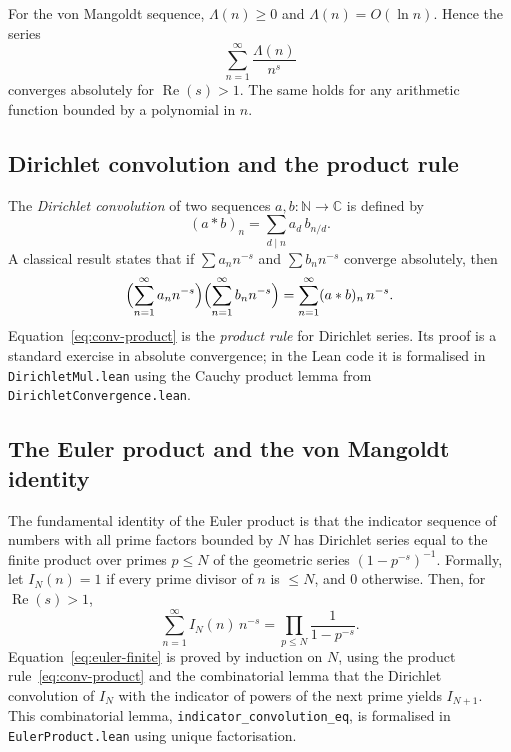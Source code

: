 \documentclass[11pt,reqno]{amsart}
\theoremstyle{definition}
\theoremstyle{remark}
\begin{document}
For the von Mangoldt sequence, \(\Lambda(n)\ge 0\) and \(\Lambda(n)=O(\ln n)\).  Hence the series
\[
\sum_{n=1}^{\infty}\frac{\Lambda(n)}{n^{s}}
\]
converges absolutely for \(\operatorname{Re}(s)>1\).  The same holds for any arithmetic function bounded by a polynomial in \(n\).

\subsection{Dirichlet convolution and the product rule}
\label{sec:convolution}

The \emph{Dirichlet convolution} of two sequences \(a,b:\mathbb N\to\mathbb C\) is defined by
\[
(a*b)_n = \sum_{d\mid n} a_d\, b_{n/d}.
\]
A classical result states that if \(\sum a_n n^{-s}\) and \(\sum b_n n^{-s}\) converge absolutely, then
\begin{equation}\label{eq:conv-product}
\Bigl(\sum_{n=1}^{\infty} a_n n^{-s}\Bigr)\Bigl(\sum_{n=1}^{\infty} b_n n^{-s}\Bigr) = \sum_{n=1}^{\infty} (a*b)_n\, n^{-s}.
\end{equation}
Equation~\eqref{eq:conv-product} is the \emph{product rule} for Dirichlet series.  Its proof is a standard exercise in absolute convergence; in the Lean code it is formalised in \texttt{DirichletMul.lean} using the Cauchy product lemma from \texttt{DirichletConvergence.lean}.

\subsection{The Euler product and the von Mangoldt identity}
\label{sec:euler-product-proof}

The fundamental identity of the Euler product is that the indicator sequence of numbers with all prime factors bounded by \(N\) has Dirichlet series equal to the finite product over primes \(p\le N\) of the geometric series \((1-p^{-s})^{-1}\).  Formally, let \(I_N(n)=1\) if every prime divisor of \(n\) is \(\le N\), and \(0\) otherwise.  Then, for \(\operatorname{Re}(s)>1\),
\begin{equation}\label{eq:euler-finite}
\sum_{n=1}^{\infty} I_N(n)\, n^{-s} = \prod_{p\le N}\frac{1}{1-p^{-s}}.
\end{equation}
Equation~\eqref{eq:euler-finite} is proved by induction on \(N\), using the product rule~\eqref{eq:conv-product} and the combinatorial lemma that the Dirichlet convolution of \(I_N\) with the indicator of powers of the next prime yields \(I_{N+1}\).  This combinatorial lemma, \texttt{indicator\_convolution\_eq}, is formalised in \texttt{EulerProduct.lean} using unique factorisation.
\end{document}

